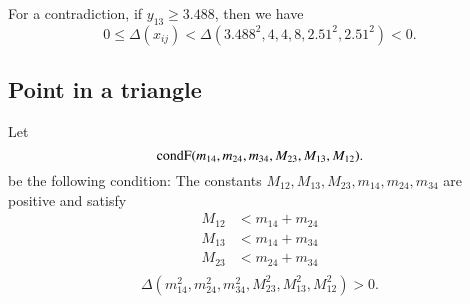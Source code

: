 \begin{tarskidata}
\begin{tarski}


\begin{proved}
For a contradiction, if $y_{13}\ge 3.488$, then
we have
    $$0\le \Delta(x_{ij}) < \Delta(3.488^2,4,4,8,2.51^2,2.51^2)<0.$$
\swallowed\end{proved}
\end{tarski}






%




\begin{tarski}
\section{Point in a triangle}

\begin{definition}[$\op{condF}$]
Let
	$$
	{\operatorname{condF}}(m_{14},m_{24},m_{34},M_{23},M_{13},M_{12}).
	$$
be the following condition:
The constants $M_{12},M_{13},M_{23},m_{14},m_{24},m_{34}$ are positive and
satisfy 
	$$
	\begin{array}{rll}
		M_{12} &< m_{14} + m_{24}\\
		M_{13} &< m_{14} + m_{34}\\
		M_{23} &< m_{24} + m_{34}\\
	\end{array}
	$$
$$
		\Delta(m_{14}^2,m_{24}^2,m_{34}^2,M_{23}^2,M_{13}^2,M_{12}^2) > 0.
$$
\end{definition}
\end{tarski}




\end{tarskidata}
